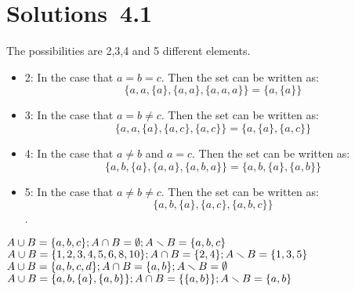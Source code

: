 \section*{Solutions~4.1}%

\begin{solutions}
	\solution
		The possibilities are 2,3,4 and 5 different elements.
		\begin{itemize}
			\item 2: In the case that $a=b=c$. Then the set can be written as: \[\{a, a, \{a\}, \{a, a\}, \{a,a,a\}\}=\{a, \{a\}\}\]
			\item 3: In the case that $a=b\neq c$. Then the set can be written as: \[\{a, a, \{a\}, \{a, c\}, \{a,c\}\}=\{a, \{a\}, \{a, c\}\}\]
			\item 4: In the case that $a\neq b$ and $a=c$. Then the set can be written as: \[\{a, b, \{a\}, \{a, a\}, \{a,b,a\}\}=\{a, b, \{a\}, \{a, b\}\}\]
			\item 5: In the case that $a\neq b\neq c$. Then the set can be written as: \[\{a, b, \{a\}, \{a, c\}, \{a,b,c\}\}\].
		\end{itemize}

	\solution
		\spart $A \cup B = \{a,b,c\}; A \cap B = \emptyset; A \smallsetminus B = \{a,b,c\}$
		\spart $A \cup B = \{1,2,3,4,5,6,8,10\}; A \cap B = \{2,4\}; A \smallsetminus B = \{1,3,5\}$
		\spart $A \cup B = \{a,b,c,d\}; A \cap B = \{a,b\}; A \smallsetminus B = \emptyset$
		\spart $A \cup B = \{a,b,\{a\},\{a,b\}\}; A \cap B = \{\{a,b\}\}; A \smallsetminus B = \{a,b\}$

	\solution
		\spart {}
		\spart {}
		\spart {}
\end{solutions}
